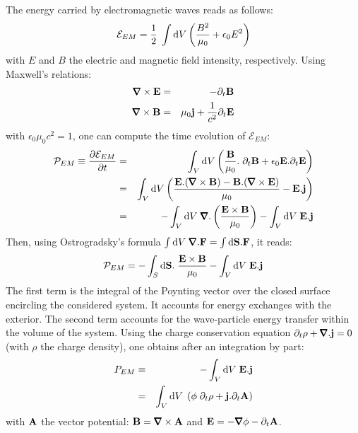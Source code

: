 \documentclass[11pt]{article}
\newcommand{\dd}{\textrm d}
\newcommand{\Abf}{{\bf A}}
\newcommand{\Bbf}{{\bf B}}
\newcommand{\Ebf}{{\bf E}}
\newcommand{\Fbf}{{\bf F}}
\newcommand{\Sbf}{{\bf S}}
\newcommand{\jbf}{{\bf j}}
\newcommand{\nablabf}{{\pmb\nabla}}
\begin{document}
The energy carried by electromagnetic waves reads as follows:
\begin{equation}
  \mathcal{E}_{EM} = \frac{1}{2}\;
  \int \dd V\left( \frac{B^2}{\mu_0} + \epsilon_0 E^2\right)
\end{equation}
with $E$ and $B$ the electric and magnetic field intensity, respectively. Using Maxwell's relations:
\begin{eqnarray*}
  \nablabf \times \Ebf &=& -\partial_t \Bbf \\
  \nablabf \times \Bbf &=& \mu_0 \jbf +
  \frac{1}{c^2}\partial_t \Ebf
\end{eqnarray*}
with $\epsilon_0 \mu_0 c^2=1$, one can compute the time evolution of $\mathcal{E}_{EM}$:
\begin{eqnarray*}
  \mathcal{P}_{EM} \equiv \frac{\partial \mathcal{E}_{EM}}{\partial t}
  &=& \int_V \dd V \left( \frac{\Bbf}{\mu_0}.\; \partial_t\Bbf+
  \epsilon_0 \Ebf. \partial_t\Ebf\right) \\
  &=& \int_V \dd V \left( \frac{\Ebf.(\nablabf \times\Bbf)-
  \Bbf.(\nablabf \times\Ebf)}{\mu_0} -\Ebf.\jbf\right)\\
  &=& -\int_V \dd V\; \nablabf.\left(\frac{\Ebf\times\Bbf}{\mu_0}\right)
  -\int_V\dd V\; \Ebf.\jbf
\end{eqnarray*}
Then, using Ostrogradsky's formula $\int \dd V\; \nablabf.\Fbf =\int \dd \Sbf.\Fbf$, it reads:
\begin{equation}
  \mathcal{P}_{EM} = - \int_S \dd \Sbf.\; \frac{\Ebf\times \Bbf}{\mu_0} -
  \int_V\dd V\; \Ebf.\jbf
\end{equation}
The first term is the integral of the Poynting vector over the closed surface encircling the considered system. It accounts for energy exchanges with the exterior. The second term accounts for the wave-particle energy transfer within the volume of the system. Using the charge conservation equation $\partial_t \rho + \nablabf.\jbf=0$ (with $\rho$ the charge density), one obtains after an integration by part:
\begin{eqnarray*}
  P_{EM} &\equiv& -\int_V\dd V\; \Ebf.\jbf \\
  &=& \int_V \dd V\; \left(\phi \;\partial_t \rho +
  \jbf. \partial_t\Abf \right)
\end{eqnarray*}
with $\Abf$ the vector potential: $\Bbf=\nablabf \times \Abf$ and $\Ebf =-\nablabf \phi-\partial_t \Abf$.\\
\end{document}
